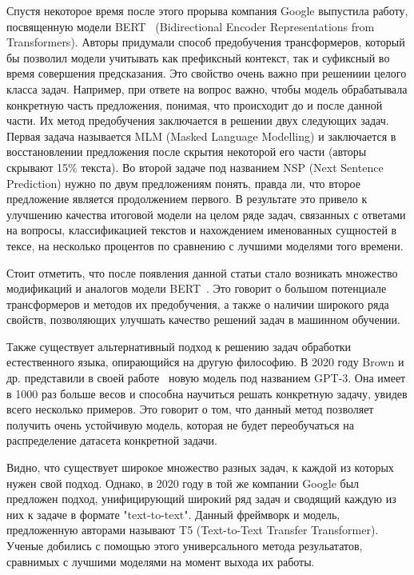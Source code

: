 \documentclass{spbau-diploma}
\begin{document}
Спустя некоторое время после этого прорыва компания Google выпустила работу, посвященную модели BERT~\cite{devlin2018bert} (Bidirectional Encoder Representations from Transformers). Авторы придумали способ предобучения трансформеров, который бы позволил модели учитывать как префиксный контекст, так и суфиксный во время совершения предсказания. Это свойство очень важно при решениии целого класса задач. Например, при ответе на вопрос важно, чтобы модель обрабатывала конкретную часть предложения, понимая, что происходит до и после данной части. Их метод предобучения заключается в решении двух следующих задач. Первая задача называется MLM (Masked Language Modelling) и заключается в восстановлении предложения после скрытия некоторой его части (авторы скрывают 15\% текста). Во второй задаче под названием NSP (Next Sentence Prediction) нужно по двум предложениям понять, правда ли, что второе предложение является продолжением первого. В результате это привело к улучшению качества итоговой модели на целом ряде задач, связанных с ответами на вопросы, классификацией текстов и нахождением именованных сущностей в тексе, на несколько процентов по сравнению с лучшими моделями того времени. 

Стоит отметить, что после появления данной статьи стало возникать множество модификаций и аналогов модели BERT~\cite{lan2019albert,lewis2019bart,he2020deberta,sanh2019distilbert,le2019flaubert,nguyen2020phobert,liu2019roberta,iandola2020squeezebert}. Это говорит о большом потенциале трансформеров и методов их предобучения, а также о наличии широкого ряда свойств, позволяющих улучшать качество решений задач в машинном обучении.

Также существует альтернативный подход к решению задач обработки естественного языка, опирающийся на другую философию. В 2020 году Brown и др. представили в своей работе~\cite{brown2020language} новую модель под названием GPT-3. Она имеет в 1000 раз больше весов и способна научиться решать конкретную задачу, увидев всего несколько примеров. Это говорит о том, что данный метод позволяет получить очень устойчивую модель, которая не будет переобучаться на распределение датасета конкретной задачи.

Видно, что существует широкое множество разных задач, к каждой из которых нужен свой подход. Однако, в 2020 году в той же компании Google был предложен подход, унифицирующий широкий ряд задач и сводящий каждую из них к задаче в формате "text-to-text". Данный фреймворк и модель, предложенную авторами называют T5 (Text-to-Text Transfer Transformer). Ученые добились с помощью этого универсального метода резульататов, сравнимых с лучшими моделями на момент выхода их работы.
\end{document}

